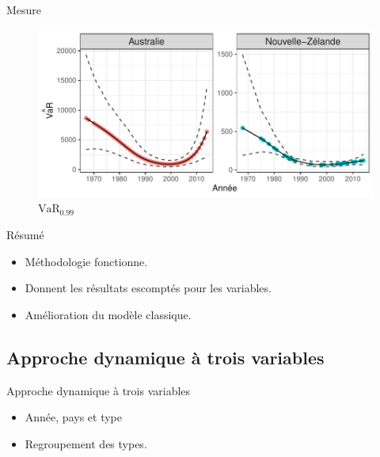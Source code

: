 \begin{frame}{Mesure }
\begin{figure}
\includegraphics[width=.8\textwidth]{images/fig-019.pdf}
\caption{$\widehat{\text{VaR}_{0.99}}$}
\end{figure}
\end{frame}


\begin{frame}{Résumé}
\begin{itemize}
\item Méthodologie fonctionne. 
\item Donnent les résultats escomptés pour les variables.
\item Amélioration du modèle classique.
\end{itemize}
\end{frame}




\subsection{Approche dynamique à trois variables}

\begin{frame}{Approche dynamique à trois variables}
\begin{itemize}
\item Année, pays et type \pause
\item Regroupement des types.
\end{itemize}
\end{frame}

